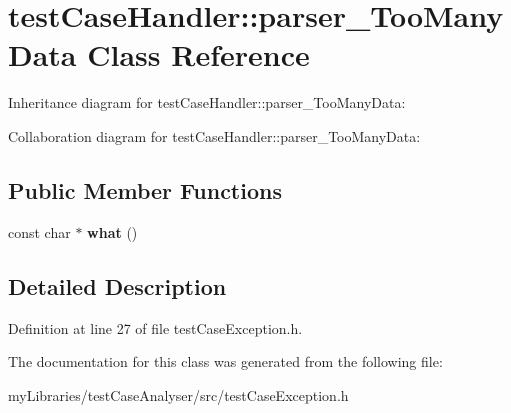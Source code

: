 \hypertarget{classtestCaseHandler_1_1parser__TooManyData}{}\section{test\+Case\+Handler\+::parser\+\_\+\+Too\+Many\+Data Class Reference}
\label{classtestCaseHandler_1_1parser__TooManyData}


Inheritance diagram for test\+Case\+Handler\+::parser\+\_\+\+Too\+Many\+Data\+:


Collaboration diagram for test\+Case\+Handler\+::parser\+\_\+\+Too\+Many\+Data\+:
\subsection*{Public Member Functions}
\begin{DoxyCompactItemize}
\item 
\mbox{\label{classtestCaseHandler_1_1parser__TooManyData_a0080f0e4e23f994f35ed85a2b4f6e840}} 
const char $\ast$ {\bfseries what} ()
\end{DoxyCompactItemize}


\subsection{Detailed Description}


Definition at line 27 of file test\+Case\+Exception.\+h.



The documentation for this class was generated from the following file\+:\begin{DoxyCompactItemize}
\item 
my\+Libraries/test\+Case\+Analyser/src/test\+Case\+Exception.\+h\end{DoxyCompactItemize}
